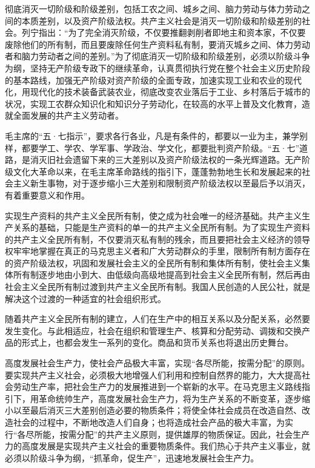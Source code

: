 \documentclass{book}
\begin{document}
彻底消灭一切阶级和阶级差别，包括工农之间、城乡之间、脑力劳动与体力劳动之间的本质差别，以及资产阶级法权。共产主义社会是消灭一切阶级和阶级差别的社会。列宁指出：“为了完全消灭阶级，不仅要推翻剥削者即地主和资本家，不仅要废除他们的所有制，而且要废除任何生产资料私有制，要消灭城乡之间、体力劳动者和脑力劳动者之间的差别。”为了彻底消灭一切阶级和阶级差别，必须以阶级斗争为纲，坚持无产阶级专政下的继续革命，认真贯彻执行党在整个社会主义历史阶段的基本路线，加强无产阶级对资产阶级的全面专政，加速实现工业和农业的现代化，用现代化的技术装备武装农业，彻底改变农业落后于工业、乡村落后于城市的状况，实现工农群众知识化和知识分子劳动化，在较高的水平上普及文化教育，造就全面发展的共产主义劳动者。

毛主席的“五·七指示”，要求各行各业，凡是有条件的，都要以一业为主，兼学别样，都要学工、学农、学军事、学政治、学文化，都要批判资产阶级。“五·七”道路，是消灭旧社会遗留下来的三大差别以及资产阶级法权的一条光辉道路。无产阶级文化大革命以来，在毛主席革命路线的指引下，蓬蓬勃勃地生长和发展起来的社会主义新生事物，对于逐步缩小三大差别和限制资产阶级法权以至最后予以消灭，有着重要意义和作用。

实现生产资料的共产主义全民所有制，使之成为社会唯一的经济基础。共产主义生产关系的基础，只能是生产资料的单一的共产主义全民所有制。为了实现生产资料的共产主义全民所有制，不仅要消灭私有制的残余，而且要把社会主义经济的领导权牢牢地掌握在真正的马克思主义者和广大劳动群众的手里，限制所有制方面存在的资产阶级法权，巩固和发展社会主义的全民所有制和集体所有制，使社会主义集体所有制逐步地由小到大、由低级向高级地提高到社会主义全民所有制，然后再由社会主义全民所有制过渡到共产主义全民所有制。我国人民创造的人民公社，就是解决这个过渡的一种适宜的社会组织形式。

随着共产主义全民所有制的建立，人们在生产中的相互关系以及分配关系，必然要发生变化。与此相适应，社会在组织和管理生产、核算和分配劳动、调拨和交换产品的形式上，也都会发生一系列的变化。商品和货币关系也将退出历史舞台。

高度发展社会生产力，使社会产品极大丰富，实现“各尽所能，按需分配”的原则。要实现共产主义社会，必须极大地增强人们利用和控制自然界的能力，大大提高社会劳动生产率，把社会生产力的发展推进到一个崭新的水平。在马克思主义路线指引下，用革命统帅生产，高度发展社会生产力，将为生产关系的不断变革，逐步缩小以至最后消灭三大差别创造必要的物质条件；将使全体社会成员在改造自然、改造社会的过程中，不断地改造人们自身；也将造成社会产品的极大丰富，为实行“各尽所能，按需分配”的共产主义原则，提供雄厚的物质保证。因此，社会生产力的高度发展是实现共产主义社会的重要物质条件。我们热心于共产主义事业，就必须以阶级斗争为纲，“抓革命，促生产”，迅速地发展社会生产力。
\end{document}
